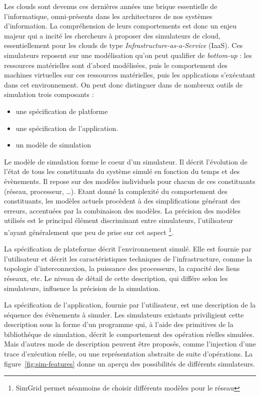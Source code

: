 \documentclass[parallelisme]{compas2017}
\begin{document}
Les  clouds  sont  devenus  ces  dernières  années  une  brique  essentielle  de
l'informatique,   omni-présents  dans   les   architectures   de  nos   systèmes
d'information. La compréhension de leurs  comportements est donc un enjeu majeur
qui a incité les chercheurs à proposer des simulateurs de cloud, essentiellement
pour les clouds de type \textit{Infrastructure-as-a-Service} (IaaS). Ces
simulateurs   reposent   sur   une   modélisation  qu'on   peut   qualifier   de
\textit{bottom-up} : les ressources matérielles sont d'abord modélisées, puis le
comportement des  machines virtuelles sur  ces ressources matérielles,  puis les
applications s'exécutant dans cet environnement. On peut donc distinguer dans 
de nombreux outils de simulation trois composants : 
\begin{itemize}
		\item une spécification de platforme
		\item une spécification de l'application.
		\item un modèle de simulation
\end{itemize}

Le modèle de simulation forme le coeur d'un simulateur. Il décrit l'évolution de
l'état de tous  les constituants du système  simulé en fonction du  temps et des
évènements.   Il  repose  sur  des   modèles  individuels  pour  chacun  de  ces
constituants  (réseau,  processeur,  \ldots).   Etant  donné  la  complexité  du
comportement   des   constituants,  les   modèles   actuels   procèdent  à   des
simplifications  générant  des  erreurs,   accentuées  par  la  combinaison  des
modèles. La précision des modèles utilisés est le principal élément discriminant
entre simulateurs, l'utilisateur  n'ayant généralement que peu de  prise sur cet
aspect%
\footnote{SimGrid  permet  néanmoins  de  choisir  différents  modèles  pour  le
  réseau}.

La spécification de plateforme décrit  l'environnement simulé.  Elle est fournie
par l'utilisateur et décrit les caractéristiques techniques de l'infrastructure,
comme la topologie  d'interconnexion, la puissance des  processeurs, la capacité
des liens réseaux,  etc.  Le niveau de détail de  cette description, qui différe
selon les simulateurs, influence la précision de la simulation.

La  spécification   de  l'application,   fournie  par  l'utilisateur,   est  une
description de la  séquence des évènements à simuler.  Les simulateurs existants
priviligient cette  description sous la forme  d'un programme qui, à  l'aide des
primitives  de  la  bibliothéque  de  simulation,  décrit  le  comportement  des
opération  réelles simulées.   Mais d'autres  mode de  description peuvent  être
proposés,   comme   l'injection  d'une   trace   d'exécution   réelle,  ou   une
représentation abstraite de suite d'opérations. La figure~\ref{fig:sim-features}
donne un aperçu des possibilités de différents simulateurs.
\end{document}
